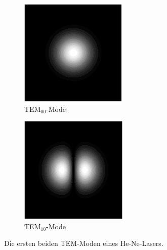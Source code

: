 \begin{figure}
  \centering
  \begin{subfigure}[c]{0.4\textwidth}
    \includegraphics[width=\textwidth]{Bilder/TEM00.png}
    \caption{TEM$_{00}$-Mode}
    \label{fig:TEM00}
  \end{subfigure}
  \begin{subfigure}[c]{0.4\textwidth}
    \includegraphics[width=\textwidth]{Bilder/TEM10.png}
    \caption{TEM$_{10}$-Mode}
    \label{fig:TEM10}
  \end{subfigure}
  \caption{Die ersten beiden TEM-Moden eines He-Ne-Lasers.}
\end{figure}

